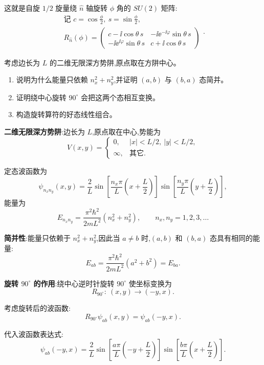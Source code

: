 \begin{question}
\begin{solution}
	这就是自旋 $1/2$ 旋量绕 $\hat n$ 轴旋转 $\phi$ 角的 $SU(2)$ 矩阵:
	\[
	\boxed{\begin{gathered}\text{记 }c=\cos\frac{\phi}{2},\ s=\sin\frac{\phi}{2},\\R_{\hat n}(\phi)=\begin{pmatrix}
c-\ii\cos\theta\,s&-\ii \ee^{-\ii\varphi}\sin\theta\,s\\
-\ii \ee^{\ii\varphi}\sin\theta\,s&c+\ii\cos\theta\,s
\end{pmatrix}\end{gathered}}.
	\]
	\end{solution}
\end{question}

\begin{question}
考虑边长为 $L$ 的二维无限深方势阱,原点取在方阱中心。
\begin{enumerate}
\item 说明为什么能量只依赖 $n_x^2+n_y^2$,并证明 $(a,b)$ 与 $(b,a)$ 态简并。
\item 证明绕中心旋转 $90^\circ$ 会把这两个态相互变换。
\item 构造旋转算符的好态线性组合。
\end{enumerate}
\begin{solution}
	\textbf{二维无限深方势阱}:边长为 $L$,原点取在中心,势能为
	\[
	V(x,y) = \begin{cases}
	0, & |x|<L/2,\ |y|<L/2,\\
	\infty, & \text{其它}.
	\end{cases}
	\]

	定态波函数为
	\[
	\psi_{n_x n_y}(x,y) = \frac{2}{L}\sin\!\left[\frac{n_x\pi}{L}\left(x+\frac{L}{2}\right)\right]
	\sin\!\left[\frac{n_y\pi}{L}\left(y+\frac{L}{2}\right)\right],
	\]
	能量为
	\[
	E_{n_x n_y} = \frac{\pi^2\hbar^2}{2mL^2}(n_x^2+n_y^2),\qquad n_x,n_y=1,2,3,\ldots
	\]

	\textbf{简并性}:能量只依赖于 $n_x^2+n_y^2$,因此当 $a\neq b$ 时,$(a,b)$ 和 $(b,a)$ 态具有相同的能量:
	\[
	E_{ab} = \frac{\pi^2\hbar^2}{2mL^2}(a^2+b^2) = E_{ba}.
	\]

	\textbf{旋转 $90^\circ$ 的作用}:绕中心逆时针旋转 $90^\circ$ 使坐标变换为
	\[
	R_{90^\circ}:\ (x,y) \longrightarrow (-y,x).
	\]

	考虑旋转后的波函数:
	\[
	R_{90^\circ}\psi_{ab}(x,y) = \psi_{ab}(-y,x).
	\]

	代入波函数表达式:
	\[
	\psi_{ab}(-y,x)=\frac{2}{L}\sin\!\left[\frac{a\pi}{L}\left(-y+\frac{L}{2}\right)\right]
	\sin\!\left[\frac{b\pi}{L}\left(x+\frac{L}{2}\right)\right].
	\]


\end{solution}
\end{question}
